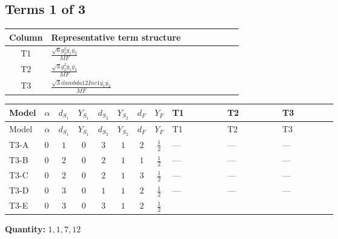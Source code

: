 \documentclass[8pt]{article}
\begin{document}
\begin{landscape}
\subsection*{Terms 1 of 3}
\begin{center}
\begin{tabular}{@{}c >{\raggedright\arraybackslash}p{0.82\linewidth}@{}}
\toprule
Column & Representative term structure \\
\midrule
T1 & \(\displaystyle \frac{\sqrt{6} g_{2}^{2} \overline{y_{1}} \overline{y_{2}}}{MF}\) \\
\midrule
T2 & \(\displaystyle \frac{\sqrt{3} g_{2}^{2} \overline{y_{1}} \overline{y_{2}}}{MF}\) \\
\midrule
T3 & \(\displaystyle \frac{\sqrt{3} i lambda12Inv1 \overline{y_{1}} \overline{y_{2}}}{MF}\) \\
\midrule
\bottomrule
\end{tabular}
\end{center}
\smallskip
\tiny
\begin{longtable}{@{}llcccccc >{\raggedright\arraybackslash}p{0.21\linewidth} >{\raggedright\arraybackslash}p{0.21\linewidth} >{\raggedright\arraybackslash}p{0.21\linewidth}@{}}
\toprule
Model & $\alpha$ & $d_{S_1}$ & $Y_{S_1}$ & $d_{S_2}$ & $Y_{S_2}$ & $d_F$ & $Y_F$ & T1 & T2 & T3 \\
\midrule
\endfirsthead
\toprule
Model & $\alpha$ & $d_{S_1}$ & $Y_{S_1}$ & $d_{S_2}$ & $Y_{S_2}$ & $d_F$ & $Y_F$ & T1 & T2 & T3 \\
\midrule
\endhead
T3-A & $0$ & $1$ & $0$ & $3$ & $1$ & $2$ & $\frac{1}{2}$ & --- & --- & --- \\
\midrule
T3-B & $0$ & $2$ & $0$ & $2$ & $1$ & $1$ & $\frac{1}{2}$ & --- & --- & --- \\
\midrule
T3-C & $0$ & $2$ & $0$ & $2$ & $1$ & $3$ & $\frac{1}{2}$ & --- & --- & --- \\
\midrule
T3-D & $0$ & $3$ & $0$ & $1$ & $1$ & $2$ & $\frac{1}{2}$ & --- & --- & --- \\
\midrule
T3-E & $0$ & $3$ & $0$ & $3$ & $1$ & $2$ & $\frac{1}{2}$ & \scriptsize\adjustbox{max width=\linewidth}{$\begin{gathered} - \frac{\sqrt{6} g_{2}^{2} \overline{y_{1}} \overline{y_{2}}}{3 MF}\end{gathered}$} & \scriptsize\adjustbox{max width=\linewidth}{$\begin{gathered} - \frac{\sqrt{3} g_{2}^{2} \overline{y_{1}} \overline{y_{2}}}{6 MF}\end{gathered}$} & \scriptsize\adjustbox{max width=\linewidth}{$\begin{gathered} - \frac{\sqrt{3} i lambda12Inv1 \overline{y_{1}} \overline{y_{2}}}{6 MF}\end{gathered}$} \\
\midrule
\bottomrule
\end{longtable}
\clearpage
\noindent\textbf{Quantity: }$\mathrm{1,1,7,12}$\par\smallskip

\end{landscape}
\end{document}
